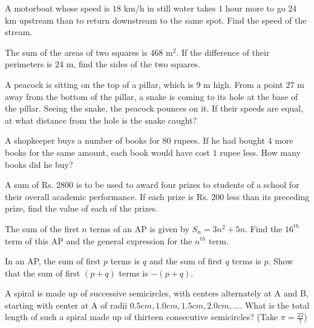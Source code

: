 \documentclass[12pt,a4paper]{exam}
\begin{document}
\begin{questions}
\question[5] A motorboat whose speed is $18$ km/h in still water takes $1$ hour more to go $24$ km upstream than to return downstream to the same spot. Find the speed of the stream.
\vspace{0.15cm}

\question[5] The sum of the areas of two squares is $468$ m$^2$. If the difference of their perimeters is $24$ m, find the sides of the two squares.
\vspace{0.15cm}

\question[5] A peacock is sitting on the top of a pillar, which is $9$ m high. From a point $27$ m away from the bottom of the pillar, a snake is coming to its hole at the base of the pillar. Seeing the snake, the peacock pounces on it. If their speeds are equal, at what distance from the hole is the snake caught?
\vspace{0.15cm}

\question[5] A shopkeeper buys a number of books for $80$ rupees. If he had bought $4$ more books for the same amount, each book would have cost $1$ rupee less. How many books did he buy?
\vspace{0.15cm}

\question[5] A sum of $\text{Rs.~} 2800$ is to be used to award four prizes to students of a school for their overall academic performance. If each prize is $\text{Rs.~} 200$ less than its preceding prize, find the value of each of the prizes.
\vspace{0.15cm}

\question[5] The sum of the first $n$ terms of an AP is given by $S_n = 3n^2 + 5n$. Find the $16^{th}$ term of this AP and the general expression for the $n^{th}$ term.
\vspace{0.15cm}

\question[5] In an AP, the sum of first $p$ terms is $q$ and the sum of first $q$ terms is $p$. Show that the sum of first $(p+q)$ terms is $-(p+q)$.
\vspace{0.15cm}

\question[5] A spiral is made up of successive semicircles, with centers alternately at A and B, starting with center at A of radii $0.5 cm, 1.0 cm, 1.5 cm, 2.0 cm, ...$. What is the total length of such a spiral made up of thirteen consecutive semicircles? (Take $\pi = \frac{22}{7}$)
\vspace{0.15cm}

\end{questions}
\bigskip
\end{document}
